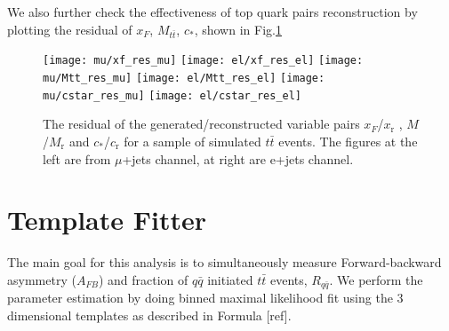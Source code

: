 \documentclass{cmspaperpdf}
\begin{document}
We also further check the effectiveness of top quark pairs reconstruction by plotting the residual of $x_F$, $M_{t\bar{t}}$, $c_*$, shown in Fig.\ref{fig:reco_res}
\begin{figure}[hbt]
  \begin{center}
    \texttt{[image: mu/xf\_res\_mu]}
    \texttt{[image: el/xf\_res\_el]}   
    \texttt{[image: mu/Mtt\_res\_mu]}
    \texttt{[image: el/Mtt\_res\_el]}
    \texttt{[image: mu/cstar\_res\_mu]}
    \texttt{[image: el/cstar\_res\_el]}
  \caption{\small The residual of the generated/reconstructed variable pairs $x_F$/$x_\mathrm{r}$ , $M$/$M_\mathrm{r}$ and $c_*$/$c_\mathrm{r}$ for a sample of simulated $t\bar t$ events. The figures at the left are from $\mu$+jets channel, at right are e+jets channel.}
    \label{fig:reco_res}
  \end{center}
\end{figure}



\section{Template Fitter}
\label{sec:fitter}
The main goal for this analysis is to simultaneously measure Forward-backward asymmetry ($A_{FB}$) and fraction of $q\bar{q}$ initiated $t\bar{t}$ events, $R_{q\bar{q}}$. We perform the parameter estimation by doing binned maximal likelihood fit using the 3 dimensional templates as described in Formula [ref].  
\end{document}
